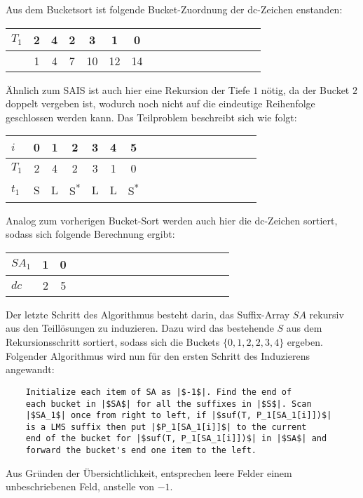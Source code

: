 \noindent Aus dem Bucketsort ist folgende Bucket-Zuordnung der dc-Zeichen enstanden:

\begin{center}
  \begin{tabular}{ | l | c | c | c | c | c | c | c | c | c | c | c | c | c | c | c | c | }
    \hline
        $T_1$ & 2 & 4 & 2 & 3 & 1 & 0 \\ \hline
              & 1 & 4 & 7 & 10 & 12 & 14  \\
    \hline
  \end{tabular}
\end{center}
\bigskip
Ähnlich zum SAIS ist auch hier eine Rekursion der Tiefe $1$ nötig, da der Bucket $2$ doppelt vergeben ist, wodurch noch nicht auf die eindeutige Reihenfolge geschlossen werden kann. Das Teilproblem beschreibt sich wie folgt:

\begin{center}
  \begin{tabular}{ | l | c | c | c | c | c | c | c | c | c | c | c | c | c | c | c | c | }
    \hline
        $i$ & 0 & 1 & 2 & 3 & 4 & 5 \\ \hline
      $T_1$ & 2 & 4 & 2 & 3 & 1 & 0  \\ \hline
      $t_1$ & S & L & S\textsuperscript{*} & L & L & S\textsuperscript{*} \\
    \hline
  \end{tabular}
\end{center}
\bigskip

\noindent Analog zum vorherigen Bucket-Sort werden auch hier die dc-Zeichen sortiert, sodass sich folgende Berechnung ergibt:

\begin{center}
  \begin{tabular}{ | l | c | c | c | c | c | c | c | c | c | c | c | c | c | c | c | c | }
    \hline
        $SA_1$ & 1 & 0 \\ \hline
        $dc$ & 2 & 5 \\
    \hline
  \end{tabular}
\end{center}
\bigskip

\noindent Der letzte Schritt des Algorithmus besteht darin, das Suffix-Array $SA$ rekursiv aus den Teillösungen zu induzieren. Dazu wird das bestehende $S$ aus dem Rekursionsschritt sortiert, sodass sich die Buckets $\{0,1,2,2,3,4\}$ ergeben. Folgender Algorithmus wird nun für den ersten Schritt des Induzierens angewandt\cite[Kap.~4.5]{saca:6}:
\begin{verbatim}
    Initialize each item of SA as |$-1$|. Find the end of
    each bucket in |$SA$| for all the suffixes in |$S$|. Scan
    |$SA_1$| once from right to left, if |$suf(T, P_1[SA_1[i]])$|
    is a LMS suffix then put |$P_1[SA_1[i]]$| to the current
    end of the bucket for |$suf(T, P_1[SA_1[i]])$| in |$SA$| and
    forward the bucket's end one item to the left.
\end{verbatim}
Aus Gründen der Übersichtlichkeit, entsprechen leere Felder einem unbeschriebenen Feld, anstelle von $-1$.


